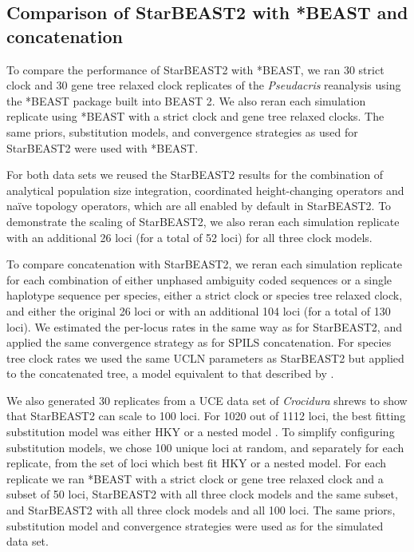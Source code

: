 \documentclass[12pt]{article}
\begin{document}
\subsection{Comparison of StarBEAST2 with *BEAST and concatenation}

To compare the performance of StarBEAST2 with *BEAST, we ran 30 strict clock
and 30 gene tree relaxed clock replicates of the \textit{Pseudacris}
reanalysis using the *BEAST package built into BEAST 2. We also reran each
simulation replicate using *BEAST with a strict clock and gene tree relaxed
clocks. The same priors, substitution models, and convergence strategies as
used for StarBEAST2 were used with *BEAST.

For both data sets we reused the StarBEAST2 results for the combination of
analytical population size integration, coordinated height-changing operators
and na\"ive topology operators, which are all enabled by default in
StarBEAST2. To demonstrate the scaling of StarBEAST2, we also reran each
simulation replicate with an additional 26 loci (for a total of 52 loci) for
all three clock models.

To compare concatenation with StarBEAST2, we reran each simulation replicate
for each combination of either unphased ambiguity coded sequences or a single
haplotype sequence per species, either a strict clock or species tree relaxed
clock, and either the original 26 loci or with an additional 104 loci (for a
total of 130 loci). We estimated the per-locus rates in the same way as for
StarBEAST2, and applied the same convergence strategy as for SPILS
concatenation. For species tree clock rates we used the same UCLN parameters
as StarBEAST2 but applied to the concatenated tree, a model equivalent to that
described by \cite{Rasmussen01122007}.

We also generated 30 replicates from a UCE data set of \textit{Crocidura}
shrews to show that StarBEAST2 can scale to 100 loci. For 1020 out of 1112
loci, the best fitting substitution model was either HKY or a nested model
\citep{Giarla01092015}. To simplify configuring substitution models, we chose
100 unique loci at random, and separately for each replicate, from the set of loci
which best fit HKY or a nested model. For each replicate we ran *BEAST with a strict clock or gene
tree relaxed clock and a subset of 50 loci, StarBEAST2 with all three clock
models and the same subset, and StarBEAST2 with all three clock models and all
100 loci. The same priors, substitution model and convergence strategies were
used as for the simulated data set.
\end{document}
